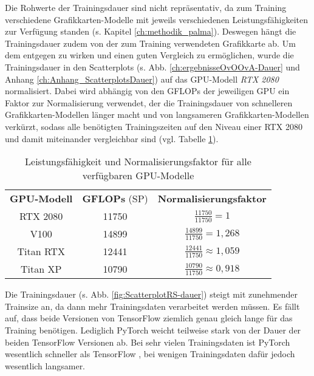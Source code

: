Die Rohwerte der Trainingsdauer sind nicht repräsentativ, da zum Training verschiedene Grafikkarten-Modelle mit jeweils verschiedenen Leistungsfähigkeiten zur Verfügung standen (s. Kapitel \ref{ch:methodik_palma}). Deswegen hängt die Trainingsdauer zudem von der zum Training verwendeten Grafikkarte ab.
Um dem entgegen zu wirken und einen guten Vergleich zu ermöglichen, wurde die Trainingsdauer in den Scatterplots (s. Abb. \ref{ch:ergebnisseOvOOvA-Dauer} und Anhang \ref{ch:Anhang_ScatterplotsDauer}) auf das GPU-Modell \textit{RTX 2080} normalisiert. Dabei wird abhängig von den GFLOPs der jeweiligen GPU ein Faktor zur Normalisierung verwendet, der die Trainingsdauer von schnelleren Grafikkarten-Modellen länger macht und von langsameren Grafikkarten-Modellen verkürzt, sodass alle benötigten Trainingszeiten auf den Niveau einer RTX 2080 und damit miteinander vergleichbar sind (vgl. Tabelle \ref{tab:GPUNormalisierung}).
\begin{table}[H]
\centering
\begin{tabular}{|c|c|c|}
\hline 
\multirow{2}{*}{\textbf{GPU-Modell}} & \multirow{2}{*}{\textbf{GFLOPs} (SP)} & \multirow{2}{*}{\textbf{Normalisierungsfaktor}}\\
& & \\
\hline 
\multirow{2}{*}{RTX 2080} & \multirow{2}{*}{11750} & \multirow{2}{*}{$\frac{11750}{11750}=1$} \\
& & \\
\hline 
\multirow{2}{*}{V100} & \multirow{2}{*}{14899} & \multirow{2}{*}{$\frac{14899}{11750}=1,268$} \\
& & \\
\hline 
\multirow{2}{*}{Titan RTX} & \multirow{2}{*}{12441} & \multirow{2}{*}{$\frac{12441}{11750} \approx 1,059$} \\
& & \\
\hline 
\multirow{2}{*}{Titan XP} & \multirow{2}{*}{10790} & \multirow{2}{*}{$\frac{10790}{11750}\approx 0,918$} \\
& & \\
\hline 
\end{tabular} 
\caption{Leistungsfähigkeit und Normalisierungsfaktor für alle verfügbaren GPU-Modelle \cite{palma2GPUs}}
\label{tab:GPUNormalisierung}
\end{table}

Die Trainingsdauer (s. Abb. \ref{fig:ScatterplotRS-dauer}) steigt mit zunehmender Trainsize an, da dann mehr Trainingsdaten verarbeitet werden müssen.
Es fällt auf, dass beide Versionen von TensorFlow \cite{tensorflow} ziemlich genau gleich lange für das Training benötigen. Lediglich PyTorch \cite{pytorch} weicht teilweise stark von der Dauer der beiden TensorFlow \cite{tensorflow} Versionen ab. Bei sehr vielen Trainingsdaten ist PyTorch \cite{pytorch} wesentlich schneller als TensorFlow \cite{tensorflow}, bei wenigen Trainingsdaten dafür jedoch wesentlich langsamer.

